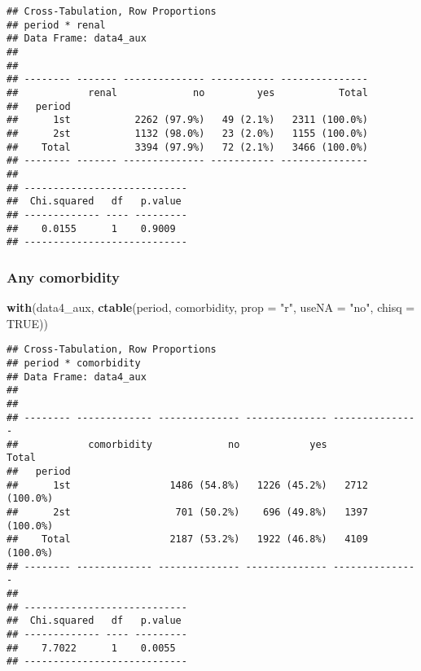 \documentclass[
]{article}
\newenvironment{Shaded}{\begin{snugshade}}{\end{snugshade}}
\newcommand{\DataTypeTok}[1]{\textcolor[rgb]{0.13,0.29,0.53}{#1}}
\newcommand{\KeywordTok}[1]{\textcolor[rgb]{0.13,0.29,0.53}{\textbf{#1}}}
\newcommand{\NormalTok}[1]{#1}
\newcommand{\OperatorTok}[1]{\textcolor[rgb]{0.81,0.36,0.00}{\textbf{#1}}}
\newcommand{\OtherTok}[1]{\textcolor[rgb]{0.56,0.35,0.01}{#1}}
\newcommand{\StringTok}[1]{\textcolor[rgb]{0.31,0.60,0.02}{#1}}
\begin{document}
\begin{Shaded}
\end{Shaded}

\begin{verbatim}
## Cross-Tabulation, Row Proportions  
## period * renal  
## Data Frame: data4_aux  
## 
## 
## -------- ------- -------------- ----------- ---------------
##            renal             no         yes           Total
##   period                                                   
##      1st           2262 (97.9%)   49 (2.1%)   2311 (100.0%)
##      2st           1132 (98.0%)   23 (2.0%)   1155 (100.0%)
##    Total           3394 (97.9%)   72 (2.1%)   3466 (100.0%)
## -------- ------- -------------- ----------- ---------------
## 
## ----------------------------
##  Chi.squared   df   p.value 
## ------------- ---- ---------
##    0.0155      1    0.9009  
## ----------------------------
\end{verbatim}

\hypertarget{any-comorbidity-2}{%
\subsubsection{Any comorbidity}\label{any-comorbidity-2}}

\begin{Shaded}
\begin{Highlighting}[]
\KeywordTok{with}\NormalTok{(data4_aux, }\KeywordTok{ctable}\NormalTok{(period, comorbidity, }\DataTypeTok{prop =} \StringTok{"r"}\NormalTok{, }\DataTypeTok{useNA =} \StringTok{"no"}\NormalTok{, }\DataTypeTok{chisq =} \OtherTok{TRUE}\NormalTok{))}
\end{Highlighting}
\end{Shaded}

\begin{verbatim}
## Cross-Tabulation, Row Proportions  
## period * comorbidity  
## Data Frame: data4_aux  
## 
## 
## -------- ------------- -------------- -------------- ---------------
##            comorbidity             no            yes           Total
##   period                                                            
##      1st                 1486 (54.8%)   1226 (45.2%)   2712 (100.0%)
##      2st                  701 (50.2%)    696 (49.8%)   1397 (100.0%)
##    Total                 2187 (53.2%)   1922 (46.8%)   4109 (100.0%)
## -------- ------------- -------------- -------------- ---------------
## 
## ----------------------------
##  Chi.squared   df   p.value 
## ------------- ---- ---------
##    7.7022      1    0.0055  
## ----------------------------
\end{verbatim}
\end{document}
